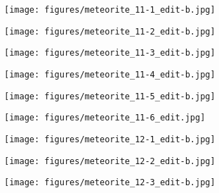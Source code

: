 \documentclass[a4paper, 11pt, oneside]{article}
\begin{document}
\clearpage
{}
\begin{figure}[t]
\texttt{[image: figures/meteorite\_11-1\_edit-b.jpg]}
\caption{}
\centering
\end{figure}
\clearpage
\begin{figure}[t]
\texttt{[image: figures/meteorite\_11-2\_edit-b.jpg]}
\caption{}
\centering
\end{figure}
\clearpage
\begin{figure}[t]
\texttt{[image: figures/meteorite\_11-3\_edit-b.jpg]}
\caption{}
\centering
\end{figure}
\clearpage
\begin{figure}[t]
\texttt{[image: figures/meteorite\_11-4\_edit-b.jpg]}
\caption{}
\centering
\end{figure}
\clearpage
\begin{figure}[t]
\texttt{[image: figures/meteorite\_11-5\_edit-b.jpg]}
\caption{}
\centering
\end{figure}
\clearpage
\begin{figure}[t]
\texttt{[image: figures/meteorite\_11-6\_edit.jpg]}
\caption{}
\centering
\end{figure}
\clearpage
{}
\begin{figure}[t]
\texttt{[image: figures/meteorite\_12-1\_edit-b.jpg]}
\caption{}
\centering
\end{figure}
\clearpage
\begin{figure}[t]
\texttt{[image: figures/meteorite\_12-2\_edit-b.jpg]}
\caption{}
\centering
\end{figure}
\clearpage
\begin{figure}[t]
\texttt{[image: figures/meteorite\_12-3\_edit-b.jpg]}
\caption{}
\centering
\end{figure}
\end{document}
